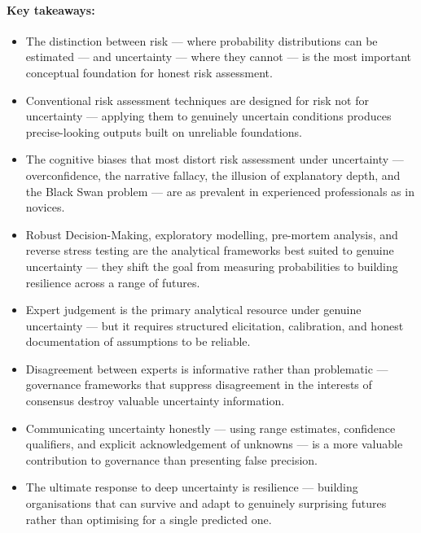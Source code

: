 \paragraph{Key takeaways:}
\begin{itemize}
  \item{The distinction between risk — where probability distributions can be estimated — and uncertainty — where they cannot — is the most important conceptual foundation for honest risk assessment.}
  \item{Conventional risk assessment techniques are designed for risk not for uncertainty — applying them to genuinely uncertain conditions produces precise-looking outputs built on unreliable foundations.}
  \item{The cognitive biases that most distort risk assessment under uncertainty — overconfidence, the narrative fallacy, the illusion of explanatory depth, and the Black Swan problem — are as prevalent in experienced professionals as in novices.}
  \item{Robust Decision-Making, exploratory modelling, pre-mortem analysis, and reverse stress testing are the analytical frameworks best suited to genuine uncertainty — they shift the goal from measuring probabilities to building resilience across a range of futures.}
  \item{Expert judgement is the primary analytical resource under genuine uncertainty — but it requires structured elicitation, calibration, and honest documentation of assumptions to be reliable.}
  \item{Disagreement between experts is informative rather than problematic — governance frameworks that suppress disagreement in the interests of consensus destroy valuable uncertainty information.}
  \item{Communicating uncertainty honestly — using range estimates, confidence qualifiers, and explicit acknowledgement of unknowns — is a more valuable contribution to governance than presenting false precision.}
  \item{The ultimate response to deep uncertainty is resilience — building organisations that can survive and adapt to genuinely surprising futures rather than optimising for a single predicted one.}
\end{itemize}

